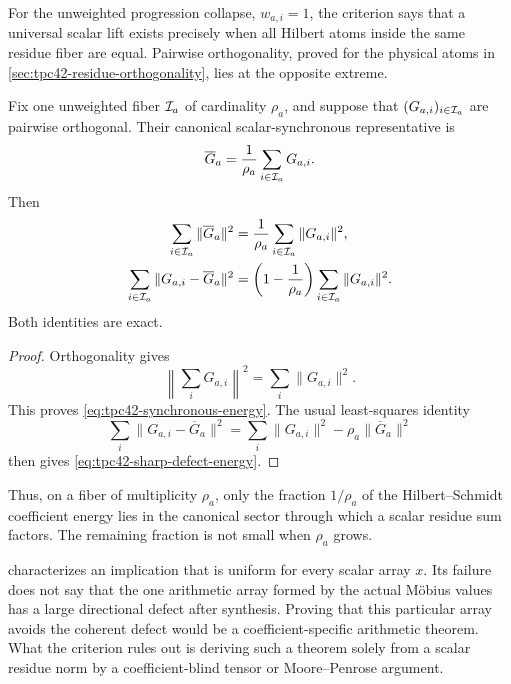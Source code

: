 For the unweighted progression collapse, \(w_{a,i}=1\), the criterion
says that a universal scalar lift exists precisely when all Hilbert atoms
inside the same residue fiber are equal.  Pairwise orthogonality, proved
for the physical atoms in \cref{sec:tpc42-residue-orthogonality}, lies at
the opposite extreme.

\begin{corollary}
\label{cor:tpc42-orthogonal-fiber-defect}
Fix one unweighted fiber \(\mathcal I_a\) of cardinality \(\rho_a\), and suppose
that \((G_{a,i})_{i\in\mathcal I_a}\) are pairwise orthogonal.  Their canonical
scalar-synchronous representative is
\begin{equation}
 \overline G_a=\frac1{\rho_a}\sum_{i\in\mathcal I_a}G_{a,i}.
 \label{eq:tpc42-fiber-mean}
\end{equation}
Then
\begin{align}
 \sum_{i\in\mathcal I_a}\|\overline G_a\|^2
 &=\frac1{\rho_a}
   \sum_{i\in\mathcal I_a}\|G_{a,i}\|^2,
 \label{eq:tpc42-synchronous-energy}\\
 \sum_{i\in\mathcal I_a}\|G_{a,i}-\overline G_a\|^2
 &=\left(1-\frac1{\rho_a}\right)
   \sum_{i\in\mathcal I_a}\|G_{a,i}\|^2.
 \label{eq:tpc42-sharp-defect-energy}
\end{align}
Both identities are exact.
\end{corollary}

\begin{proof}
Orthogonality gives
\begin{equation}
 \left\|\sum_iG_{a,i}\right\|^2=\sum_i\|G_{a,i}\|^2.
 \label{eq:tpc42-orthogonal-sum-norm}
\end{equation}
This proves \eqref{eq:tpc42-synchronous-energy}.  The usual least-squares
identity
\begin{equation}
 \sum_i\|G_{a,i}-\overline G_a\|^2
 =\sum_i\|G_{a,i}\|^2-\rho_a\|\overline G_a\|^2
 \label{eq:tpc42-mean-square-identity}
\end{equation}
then gives \eqref{eq:tpc42-sharp-defect-energy}.
\end{proof}

Thus, on a fiber of multiplicity \(\rho_a\), only the fraction
\(1/\rho_a\) of the Hilbert--Schmidt coefficient energy lies in the
canonical sector through which a scalar residue sum factors.  The
remaining fraction is not small when \(\rho_a\) grows.

\begin{remark}
\label{rem:tpc42-factorization-boundary}
 characterizes an implication
that is uniform for every scalar array \(x\).  Its failure does not say
that the one arithmetic array formed by the actual M\"obius values has a
large directional defect after synthesis.  Proving that this particular
array avoids the coherent defect would be a coefficient-specific
arithmetic theorem.  What the criterion rules out is deriving such a
theorem solely from a scalar residue norm by a coefficient-blind tensor or
Moore--Penrose argument.
\end{remark}
